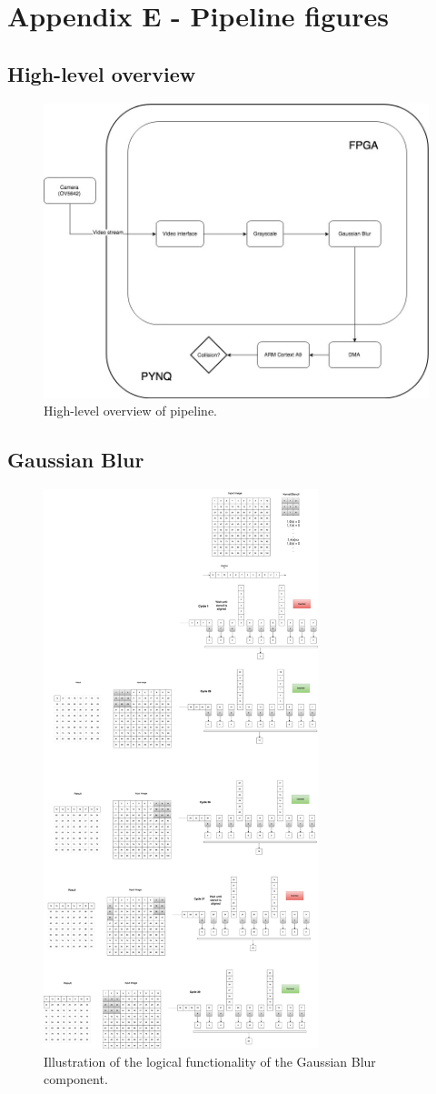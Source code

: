 \section{Appendix E - Pipeline figures}

\subsection{High-level overview}

\begin{figure}[!hbpt]
    \centering
    \includegraphics[width=12cm]{Images/Pipeline-Overview.jpg}
    \caption{High-level overview of pipeline.}
    \label{fig:pipeline-overview}
\end{figure}


\subsection{Gaussian Blur}

\begin{figure}[!hbpt]
    \centering
    \includegraphics[width=8cm]{Images/gauss.png}
    \caption{Illustration of the logical functionality of the  Gaussian Blur component.}
    \label{fig:gauss}
\end{figure}
